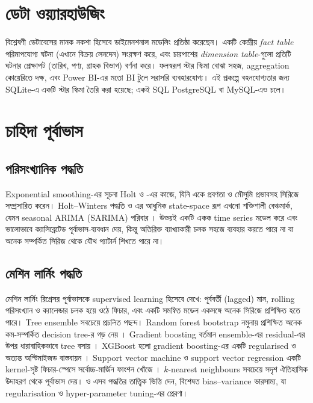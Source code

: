 \section{ডেটা ওয়্যারহাউজিং}
\citet{kimball2013} বিশ্লেষণী ডেটাবেসের মানক নকশা হিসেবে ডাইমেনশনাল মডেলিং প্রতিষ্ঠা করেছেন। একটি কেন্দ্রীয় \emph{fact table}
পরিমাপযোগ্য ঘটনা (এখানে বিক্রয় লেনদেন) সংরক্ষণ করে, এবং চারপাশের \emph{dimension table}-গুলো প্রতিটি ঘটনার প্রেক্ষাপট (তারিখ,
পণ্য, গ্রাহক বিভাগ) বর্ণনা করে। ফলস্বরূপ স্টার স্কিমা বোঝা সহজ, aggregation কোয়েরিতে দক্ষ, এবং Power BI-এর মতো BI টুলে সরাসরি
ব্যবহারযোগ্য। এই প্রকল্পে বহনযোগ্যতার জন্য SQLite-এ একটি স্টার স্কিমা তৈরি করা হয়েছে; একই SQL PostgreSQL বা MySQL-এও চলে।

\section{চাহিদা পূর্বাভাস}
\subsection{পরিসংখ্যানিক পদ্ধতি}
Exponential smoothing-এর সূচনা Holt ও \citet{winters1960}-এর কাজে, যিনি একে প্রবণতা ও মৌসুমি প্রভাবসহ সিরিজে সম্প্রসারিত
করেন। Holt--Winters পদ্ধতি ও এর আধুনিক state-space রূপ এখনো শক্তিশালী বেঞ্চমার্ক, যেমন seasonal ARIMA (SARIMA) পরিবার
\citep{hyndman2021}। উভয়ই একটি একক time series মডেল করে এবং ভালোভাবে ক্যালিব্রেটেড পূর্বাভাস-ব্যবধান দেয়, কিন্তু অতিরিক্ত
ব্যাখ্যাকারী চলক সহজে ব্যবহার করতে পারে না বা অনেক সম্পর্কিত সিরিজ থেকে যৌথ প্যাটার্ন শিখতে পারে না।

\subsection{মেশিন লার্নিং পদ্ধতি}
মেশিন লার্নিং রিগ্রেসর পূর্বাভাসকে supervised learning হিসেবে দেখে: পূর্ববর্তী (lagged) মান, rolling পরিসংখ্যান ও ক্যালেন্ডার
চলক হয়ে ওঠে ফিচার, এবং একটি সমন্বিত মডেল একসঙ্গে অনেক সিরিজে প্রশিক্ষিত হতে পারে। Tree ensemble সবচেয়ে প্রচলিত পছন্দ।
Random forest bootstrap নমুনায় প্রশিক্ষিত অনেক কম-সম্পর্কিত decision tree-র গড় নেয় \citep{breiman2001}। Gradient boosting
বর্তমান ensemble-এর residual-এর উপর ধারাবাহিকভাবে tree বসায় \citep{friedman2001}। XGBoost হলো gradient boosting-এর একটি
regularised ও অত্যন্ত অপ্টিমাইজড বাস্তবায়ন \citep{chen2016}। Support vector machine ও support vector regression একটি
kernel-সৃষ্ট ফিচার-স্পেসে সর্বোচ্চ-মার্জিন ফাংশন খোঁজে \citep{cortes1995}। $k$-nearest neighbours সবচেয়ে সদৃশ ঐতিহাসিক
উদাহরণ থেকে পূর্বাভাস দেয়। \citet{hastie2009} ও \citet{james2021} এসব পদ্ধতির তাত্ত্বিক ভিত্তি দেন, বিশেষত bias--variance
ভারসাম্য, যা regularisation ও hyper-parameter tuning-এর প্রেরণা।

